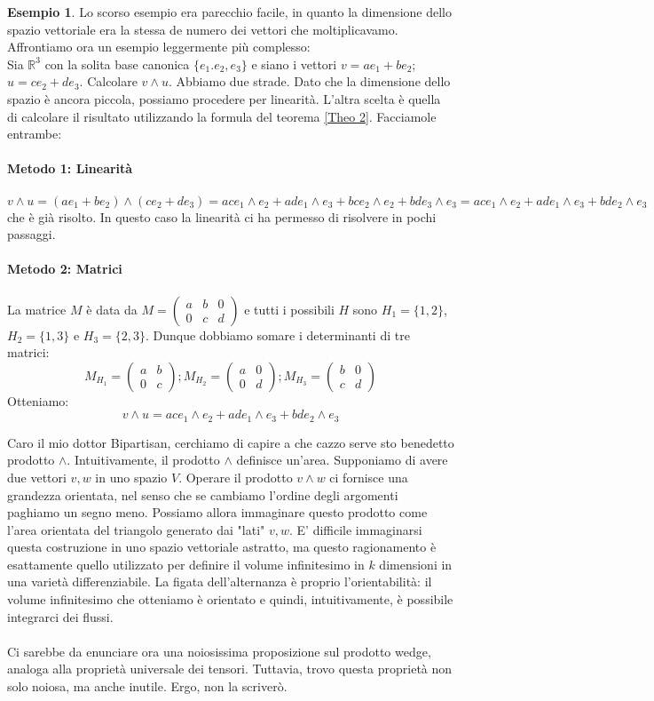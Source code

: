 \documentclass[12pt,a4paper]{report}
\theoremstyle{definition}
\theoremstyle{Theorem}
\theoremstyle{definition}
\newtheorem{Ex}[Def]{Esempio}
\theoremstyle{definition}
\theoremstyle{definition}
\begin{document}
	\begin{Ex}
		Lo scorso esempio era parecchio facile, in quanto la dimensione dello spazio vettoriale era la stessa de numero dei vettori che moltiplicavamo. Affrontiamo ora un esempio leggermente più complesso:\\
		Sia $\mathbb{R}^3$ con la solita base canonica $\{e_1.e_2,e_3\}$ e siano i vettori $v=ae_1+be_2$; $u=ce_2+de_3$. Calcolare $v\wedge u$. Abbiamo due strade. Dato che la dimensione dello spazio è ancora piccola, possiamo procedere per linearità. L'altra scelta è quella di calcolare il risultato utilizzando la formula del teorema \ref{Theo 2}. Facciamole entrambe:\\\\
		\textbf{Metodo 1: Linearità}\\
		\\
		$v\wedge u=(ae_1+be_2)\wedge(ce_2+de_3)=ace_1\wedge e_2+ade_1\wedge e_3+bce_2\wedge e_2+bde_3\wedge e_3=ace_1\wedge e_2+ade_1\wedge e_3+bde_2\wedge e_3$ che è già risolto. In questo caso la linearità ci ha permesso di risolvere in pochi passaggi.\\
		\\
		\textbf{Metodo 2: Matrici}\\
		\\
		La matrice $M$ è data da $M=\begin{pmatrix}
			a&b&0\\0&c&d
		\end{pmatrix}$ e tutti i possibili $H$ sono $H_1=\{1,2\}$,$H_2=\{1,3\}$ e $H_3=\{2,3\}$. Dunque dobbiamo somare i determinanti di tre matrici:\\
		$$M_{H_1}=\begin{pmatrix}
			a&b\\0&c
		\end{pmatrix};
		M_{H_2}=\begin{pmatrix}
			a&0\\0&d
		\end{pmatrix};
		M_{H_3}=\begin{pmatrix}
			b&0\\c&d
		\end{pmatrix}$$ 
		Otteniamo:
		$$v\wedge u=ace_1\wedge e_2+ade_1\wedge e_3+bde_2\wedge e_3$$
	\end{Ex}
	Caro il mio dottor Bipartisan, cerchiamo di capire a che cazzo serve sto benedetto prodotto $\wedge$. Intuitivamente, il prodotto $\wedge$ definisce un'area. Supponiamo di avere due vettori $v,w$ in uno spazio $V$. Operare il prodotto $v\wedge w$ ci fornisce una grandezza orientata, nel senso che se cambiamo l'ordine degli argomenti paghiamo un segno meno. Possiamo allora immaginare questo prodotto come l'area orientata del triangolo generato dai "lati" $v,w$. E' difficile immaginarsi questa costruzione in uno spazio vettoriale astratto, ma questo ragionamento è esattamente quello utilizzato per definire il volume infinitesimo in $k$ dimensioni in una varietà differenziabile. La figata dell'alternanza è proprio l'orientabilità: il volume infinitesimo che otteniamo è orientato e quindi, intuitivamente, è possibile integrarci dei flussi.
	\\\\
	Ci sarebbe da enunciare ora una noiosissima proposizione sul prodotto wedge, analoga alla proprietà universale dei tensori. Tuttavia, trovo questa proprietà non solo noiosa, ma anche inutile. Ergo, non la scriverò.
\end{document}
